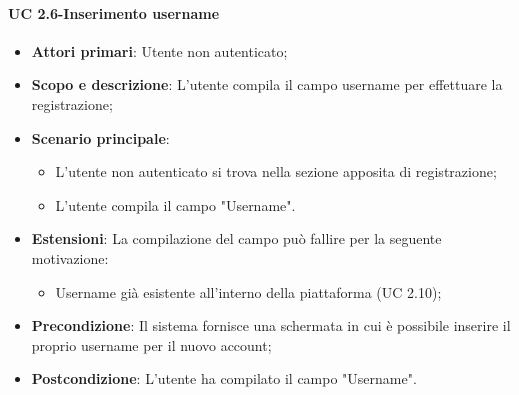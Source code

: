                 \paragraph{UC 2.6-Inserimento username}
                \begin{itemize}
                \item \textbf{Attori primari}: Utente non autenticato;
              
                \item \textbf{Scopo e descrizione}: L'utente compila il campo username per effettuare la registrazione; 
                \item \textbf{Scenario principale}: 
                    \begin{itemize}
                        \item L'utente non autenticato si trova nella sezione apposita di registrazione;
                        \item L'utente compila il campo "Username".
                    \end{itemize}
                \item \textbf{Estensioni}:  La compilazione del campo può fallire per la seguente motivazione:
                    \begin{itemize}
                     \item Username già esistente all'interno della piattaforma (UC 2.10);
                    \end{itemize}
                \item \textbf{Precondizione}: Il sistema fornisce una schermata in cui è possibile inserire il proprio               username per il nuovo account;
                \item \textbf{Postcondizione}: L'utente ha compilato il campo "Username".
                \end{itemize}
                
                

